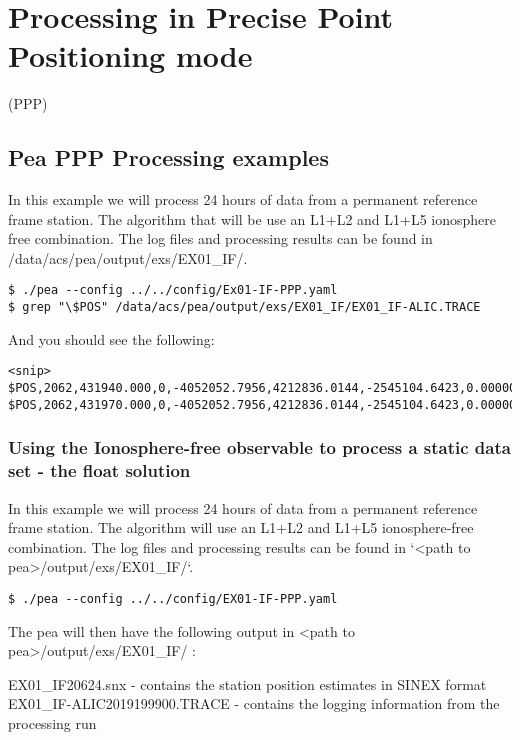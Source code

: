 \chapter{Processing in Precise Point Positioning mode}

(PPP)

\section{Pea PPP Processing examples}
In this example we will process 24 hours of data from a permanent reference frame station. The algorithm that will be use an L1+L2 and L1+L5 ionosphere free combination. The log files and processing results can be found in /data/acs/pea/output/exs/EX01\_IF/.

\begin{verbatim}
$ ./pea --config ../../config/Ex01-IF-PPP.yaml
$ grep "\$POS" /data/acs/pea/output/exs/EX01_IF/EX01_IF-ALIC.TRACE
\end{verbatim}

And you should see the following: 
\begin{verbatim}
<snip> $POS,2062,431940.000,0,-4052052.7956,4212836.0144,-2545104.6423,0.00000043966020,0.00000039738502,0.00000013421476 $POS,2062,431970.000,0,-4052052.7956,4212836.0144,-2545104.6423,0.00000043965772,0.00000039738393,0.00000013421667
\end{verbatim}


\subsection{Using the Ionosphere-free observable to process a static data set - the float solution}

In this example we will process 24 hours of data from a permanent reference frame station. The algorithm will use an L1+L2 and L1+L5 ionosphere-free combination.
The log files and processing results can be found in `<path to pea>/output/exs/EX01\_IF/`.
\begin{verbatim}
$ ./pea --config ../../config/EX01-IF-PPP.yaml
\end{verbatim}
The pea will then have the following output in <path to pea>/output/exs/EX01\_IF/ :

EX01\_IF20624.snx              - contains the station position estimates in SINEX format
EX01\_IF-ALIC2019199900.TRACE  - contains the logging information from the processing run

